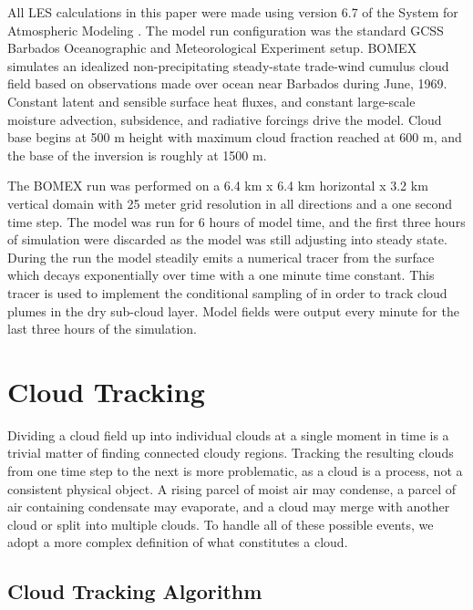 \documentclass[acp]{copernicus}
\begin{document}
All LES calculations in this paper were made using version 6.7 of the System 
for Atmospheric Modeling \citep[SAM;][]{Khairoutdinov2003}.  The model run 
configuration was the standard GCSS Barbados Oceanographic and Meteorological 
Experiment \citep[BOMEX;][]{Holland1973, Siebesma2003} setup.  BOMEX simulates 
an idealized non-precipitating steady-state trade-wind cumulus cloud field 
based on observations made over ocean near Barbados during June, 1969.  
Constant latent and sensible surface heat fluxes, and constant large-scale 
moisture advection, subsidence, and radiative forcings drive the model.  Cloud 
base begins at 500 m height with maximum cloud fraction reached at 600 m, and 
the base of the inversion is roughly at 1500 m.

The BOMEX run was performed on a 6.4 km x 6.4 km horizontal x 3.2 km vertical 
domain with 25 meter grid resolution in all directions and a one second time 
step.  The model was run for 6 hours of model time, and the first three hours 
of simulation were discarded as the model was still adjusting into steady 
state. During the run the model steadily emits a numerical tracer from the 
surface which decays exponentially over time with a one minute time constant.  
This tracer is used to implement the conditional sampling of 
\cite{Couvreaux2010} in order to track cloud plumes in the dry sub-cloud 
layer.  Model fields were output every minute for the last three hours of the 
simulation.


\section{Cloud Tracking}

Dividing a cloud field up into individual clouds at a single moment in time is 
a trivial matter of finding connected cloudy regions.  Tracking the resulting 
clouds from one time step to the next is more problematic, as a cloud is a 
process, not a consistent physical object.  A rising parcel of moist air may 
condense, a parcel of air containing condensate may evaporate, and a cloud 
may merge with another cloud or split into multiple clouds.  To handle all of 
these possible events, we adopt a more complex definition of what constitutes 
a cloud.

\subsection{Cloud Tracking Algorithm}
\end{document}

